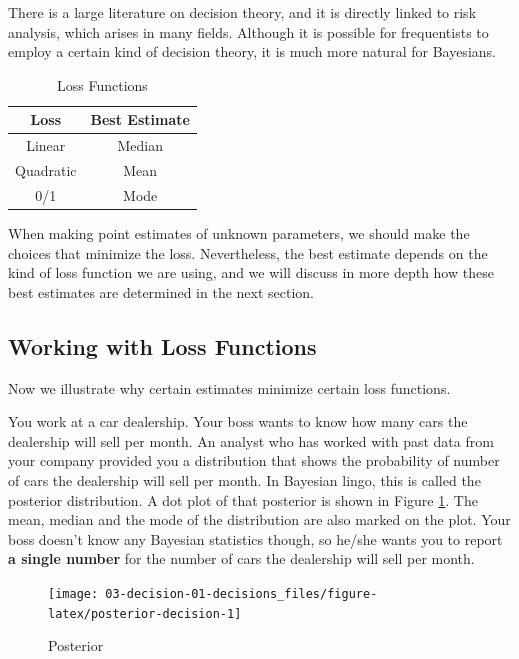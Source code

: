 \documentclass[]{book}
\theoremstyle{definition}
\theoremstyle{definition}
\theoremstyle{definition}
\theoremstyle{remark}
\let\BeginKnitrBlock\begin \let\EndKnitrBlock\end
\begin{document}
There is a large literature on decision theory, and it is directly
linked to risk analysis, which arises in many fields. Although it is
possible for frequentists to employ a certain kind of decision theory,
it is much more natural for Bayesians.

\begin{table}

\caption{\label{tab:loss-functions}Loss Functions}
\centering
\begin{tabular}[t]{cc}
\toprule
Loss & Best Estimate\\
\midrule
Linear & Median\\
Quadratic & Mean\\
0/1 & Mode\\
\bottomrule
\end{tabular}
\end{table}

When making point estimates of unknown parameters, we should make the
choices that minimize the loss. Nevertheless, the best estimate depends
on the kind of loss function we are using, and we will discuss in more
depth how these best estimates are determined in the next section.

\subsection{Working with Loss
Functions}\label{working-with-loss-functions}

Now we illustrate why certain estimates minimize certain loss functions.

\BeginKnitrBlock{example}
\protect\hypertarget{exm:car}{}{\label{exm:car} }You work at a car
dealership. Your boss wants to know how many cars the dealership will
sell per month. An analyst who has worked with past data from your
company provided you a distribution that shows the probability of number
of cars the dealership will sell per month. In Bayesian lingo, this is
called the posterior distribution. A dot plot of that posterior is shown
in Figure \ref{fig:posterior-decision}. The mean, median and the mode of
the distribution are also marked on the plot. Your boss doesn't know any
Bayesian statistics though, so he/she wants you to report \textbf{a
single number} for the number of cars the dealership will sell per
month.
\EndKnitrBlock{example}

\begin{figure}

{\centering \texttt{[image: 03-decision-01-decisions\_files/figure-latex/posterior-decision-1]} 

}

\caption{Posterior}\label{fig:posterior-decision}
\end{figure}
\end{document}
